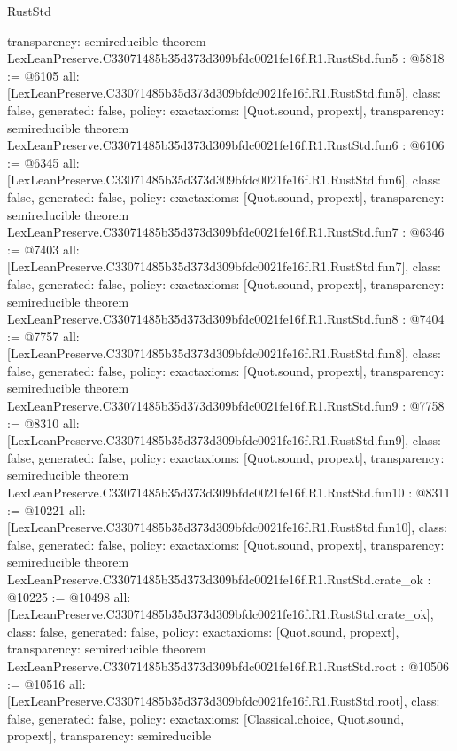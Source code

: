 \begin{lexlean}{RustStd}
\begin{coremodule}
{  transparency: semireducible
}
theorem LexLeanPreserve.C33071485b35d373d309bfdc0021fe16f.R1.RustStd.fun5 : @5818 := @6105 {
  all: [LexLeanPreserve.C33071485b35d373d309bfdc0021fe16f.R1.RustStd.fun5],
  class: false,
  generated: false,
  policy: exact{axioms: [Quot.sound, propext]},
  transparency: semireducible
}
theorem LexLeanPreserve.C33071485b35d373d309bfdc0021fe16f.R1.RustStd.fun6 : @6106 := @6345 {
  all: [LexLeanPreserve.C33071485b35d373d309bfdc0021fe16f.R1.RustStd.fun6],
  class: false,
  generated: false,
  policy: exact{axioms: [Quot.sound, propext]},
  transparency: semireducible
}
theorem LexLeanPreserve.C33071485b35d373d309bfdc0021fe16f.R1.RustStd.fun7 : @6346 := @7403 {
  all: [LexLeanPreserve.C33071485b35d373d309bfdc0021fe16f.R1.RustStd.fun7],
  class: false,
  generated: false,
  policy: exact{axioms: [Quot.sound, propext]},
  transparency: semireducible
}
theorem LexLeanPreserve.C33071485b35d373d309bfdc0021fe16f.R1.RustStd.fun8 : @7404 := @7757 {
  all: [LexLeanPreserve.C33071485b35d373d309bfdc0021fe16f.R1.RustStd.fun8],
  class: false,
  generated: false,
  policy: exact{axioms: [Quot.sound, propext]},
  transparency: semireducible
}
theorem LexLeanPreserve.C33071485b35d373d309bfdc0021fe16f.R1.RustStd.fun9 : @7758 := @8310 {
  all: [LexLeanPreserve.C33071485b35d373d309bfdc0021fe16f.R1.RustStd.fun9],
  class: false,
  generated: false,
  policy: exact{axioms: [Quot.sound, propext]},
  transparency: semireducible
}
theorem LexLeanPreserve.C33071485b35d373d309bfdc0021fe16f.R1.RustStd.fun10 : @8311 := @10221 {
  all: [LexLeanPreserve.C33071485b35d373d309bfdc0021fe16f.R1.RustStd.fun10],
  class: false,
  generated: false,
  policy: exact{axioms: [Quot.sound, propext]},
  transparency: semireducible
}
theorem LexLeanPreserve.C33071485b35d373d309bfdc0021fe16f.R1.RustStd.crate_ok : @10225 := @10498 {
  all: [LexLeanPreserve.C33071485b35d373d309bfdc0021fe16f.R1.RustStd.crate_ok],
  class: false,
  generated: false,
  policy: exact{axioms: [Quot.sound, propext]},
  transparency: semireducible
}
theorem LexLeanPreserve.C33071485b35d373d309bfdc0021fe16f.R1.RustStd.root : @10506 := @10516 {
  all: [LexLeanPreserve.C33071485b35d373d309bfdc0021fe16f.R1.RustStd.root],
  class: false,
  generated: false,
  policy: exact{axioms: [Classical.choice, Quot.sound, propext]},
  transparency: semireducible
}


\end{coremodule}
\end{lexlean}
